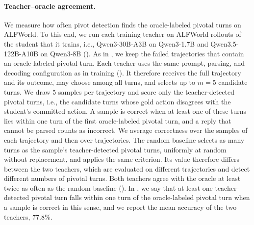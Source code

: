 \paragraph{Teacher--oracle agreement.} We measure how often pivot detection finds the oracle-labeled pivotal turns on ALFWorld. To this end, we run each training teacher on ALFWorld rollouts of the student that it trains, i.e., Qwen3-30B-A3B on Qwen3-1.7B and Qwen3.5-122B-A10B on Qwen3-8B (). As in , we keep the failed trajectories that contain an oracle-labeled pivotal turn. Each teacher uses the same prompt, parsing, and decoding configuration as in training (). It therefore receives the full trajectory and its outcome, may choose among all turns, and selects up to $m = 5$ candidate turns. We draw $5$ samples per trajectory and score only the teacher-detected pivotal turns, i.e., the candidate turns whose gold action disagrees with the student's committed action. A sample is correct when at least one of these turns lies within one turn of the first oracle-labeled pivotal turn, and a reply that cannot be parsed counts as incorrect. We average correctness over the samples of each trajectory and then over trajectories. The random baseline selects as many turns as the sample's teacher-detected pivotal turns, uniformly at random without replacement, and applies the same criterion. Its value therefore differs between the two teachers, which are evaluated on different trajectories and detect different numbers of pivotal turns. Both teachers agree with the oracle at least twice as often as the random baseline (). In , we say that at least one teacher-detected pivotal turn falls within one turn of the oracle-labeled pivotal turn when a sample is correct in this sense, and we report the mean accuracy of the two teachers, $77.8\%$.

